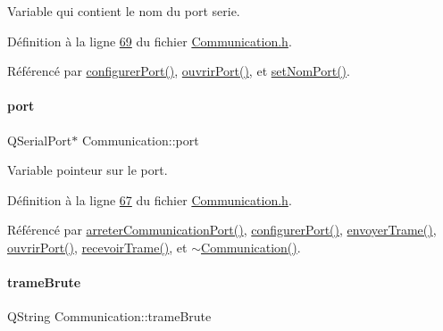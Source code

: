 Variable qui contient le nom du port serie. 



Définition à la ligne \hyperlink{_communication_8h_source_l00069}{69} du fichier \hyperlink{_communication_8h_source}{Communication.\+h}.



Référencé par \hyperlink{_communication_8cpp_source_l00063}{configurer\+Port()}, \hyperlink{_communication_8cpp_source_l00078}{ouvrir\+Port()}, et \hyperlink{_communication_8cpp_source_l00096}{set\+Nom\+Port()}.

\mbox{\label{class_communication_aff7d55208f31232fbdc1dcec488908f1}} 
\paragraph{\texorpdfstring{port}{port}}
{\footnotesize\ttfamily Q\+Serial\+Port$\ast$ Communication\+::port\hspace{0.3cm}{\ttfamily [private]}}



Variable pointeur sur le port. 



Définition à la ligne \hyperlink{_communication_8h_source_l00067}{67} du fichier \hyperlink{_communication_8h_source}{Communication.\+h}.



Référencé par \hyperlink{_communication_8cpp_source_l00053}{arreter\+Communication\+Port()}, \hyperlink{_communication_8cpp_source_l00063}{configurer\+Port()}, \hyperlink{_communication_8cpp_source_l00107}{envoyer\+Trame()}, \hyperlink{_communication_8cpp_source_l00078}{ouvrir\+Port()}, \hyperlink{_communication_8cpp_source_l00119}{recevoir\+Trame()}, et \hyperlink{_communication_8cpp_source_l00032}{$\sim$\+Communication()}.

\mbox{\label{class_communication_a7a55775be5e16249315fe5faef4f13b4}} 
\paragraph{\texorpdfstring{trame\+Brute}{trameBrute}}
{\footnotesize\ttfamily Q\+String Communication\+::trame\+Brute\hspace{0.3cm}{\ttfamily [private]}}



